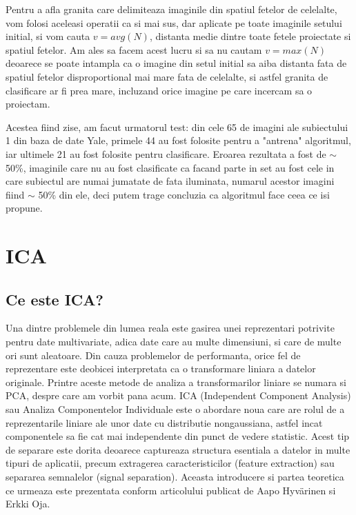 \documentclass[12pt,oneside]{article}
\begin{document}
Pentru a afla granita care delimiteaza imaginile din spatiul fetelor de celelalte, vom folosi aceleasi operatii ca si mai sus, dar aplicate pe toate imaginile setului initial, si vom cauta $v=avg(N)$, distanta medie dintre toate fetele proiectate si spatiul fetelor. Am ales sa facem acest lucru si sa nu cautam $v=max(N)$ deoarece se poate intampla ca o imagine din setul initial sa aiba distanta fata de spatiul fetelor disproportional mai mare fata de celelalte, si astfel granita de clasificare ar fi prea mare, incluzand orice imagine pe care incercam sa o proiectam.

Acestea fiind zise, am facut urmatorul test: din cele 65 de imagini ale subiectului 1 din baza de date Yale, primele 44 au fost folosite pentru a "antrena" algoritmul, iar ultimele 21 au fost folosite pentru clasificare. Eroarea rezultata a fost de $\sim$ 50\%, imaginile care nu au fost clasificate ca facand parte in set au fost cele in care subiectul are numai jumatate de fata iluminata, numarul acestor imagini fiind $\sim$ 50\% din ele, deci putem trage concluzia ca algoritmul face ceea ce isi propune. 

\newpage
\section{ICA}

\subsection{Ce este ICA? }
Una dintre problemele din lumea reala este gasirea unei reprezentari potrivite pentru date multivariate, adica date care au multe dimensiuni, si care de multe ori sunt aleatoare. Din cauza problemelor de performanta, orice fel de reprezentare este deobicei interpretata ca o transformare liniara a datelor originale. Printre aceste metode de analiza a transformarilor liniare se numara si PCA, despre care am vorbit pana acum. ICA (Independent Component Analysis) sau Analiza Componentelor Individuale este o abordare noua care are rolul de a reprezentarile liniare ale unor date cu distributie nongaussiana, astfel incat componentele sa fie cat mai independente din punct de vedere statistic. Acest tip de separare este dorita deoarece captureaza structura esentiala a datelor in multe tipuri de aplicatii, precum extragerea caracteristicilor (feature extraction) sau separarea semnalelor (signal separation). Aceasta introducere si partea teoretica ce urmeaza este prezentata conform articolului publicat de Aapo Hyvärinen si Erkki Oja.\cite{hyvarien}
\end{document}
